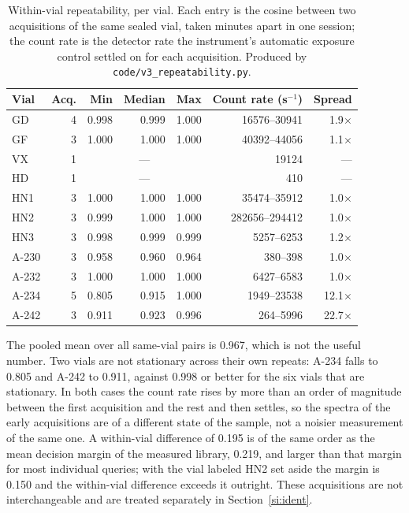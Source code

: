 \documentclass[11pt]{article}
\begin{document}
\begin{table}[htbp]
\centering
\caption{Within-vial repeatability, per vial. Each entry is the cosine between two
acquisitions of the same sealed vial, taken minutes apart in one session; the count rate is
the detector rate the instrument's automatic exposure control settled on for each
acquisition. Produced by \texttt{code/v3\_repeatability.py}.}
\label{tab:si-repeat}
\small
\begin{tabular}{lrrrrrr}
\toprule
Vial & Acq. & Min & Median & Max & Count rate (s$^{-1}$) & Spread \\
\midrule
GD & 4 & 0.998 & 0.999 & 1.000 & 16576--30941 & 1.9$\times$ \\
GF & 3 & 1.000 & 1.000 & 1.000 & 40392--44056 & 1.1$\times$ \\
VX & 1 & \multicolumn{3}{c}{---} & 19124 & --- \\
HD & 1 & \multicolumn{3}{c}{---} & 410 & --- \\
HN1 & 3 & 1.000 & 1.000 & 1.000 & 35474--35912 & 1.0$\times$ \\
HN2 & 3 & 0.999 & 1.000 & 1.000 & 282656--294412 & 1.0$\times$ \\
HN3 & 3 & 0.998 & 0.999 & 0.999 & 5257--6253 & 1.2$\times$ \\
A-230 & 3 & 0.958 & 0.960 & 0.964 & 380--398 & 1.0$\times$ \\
A-232 & 3 & 1.000 & 1.000 & 1.000 & 6427--6583 & 1.0$\times$ \\
A-234 & 5 & 0.805 & 0.915 & 1.000 & 1949--23538 & 12.1$\times$ \\
A-242 & 3 & 0.911 & 0.923 & 0.996 & 264--5996 & 22.7$\times$ \\
\bottomrule
\end{tabular}

\begin{flushleft}\footnotesize The pooled mean over all same-vial pairs is 0.967, which
is not the useful number. Two vials are not stationary across their own repeats:
A-234 falls to 0.805 and A-242 to
0.911, against 0.998 or better for the six vials
that are stationary. In both cases the count rate rises by more than an order of magnitude
between the first acquisition and the rest and then settles, so the spectra of the early
acquisitions are of a different state of the sample, not a noisier measurement of the same
one. A within-vial difference of 0.195 is of the same order as the mean decision margin
of the measured library, 0.219, and larger than that margin for most individual queries;
with the vial labeled HN2 set aside the margin is 0.150 and the within-vial difference
exceeds it outright. These acquisitions are not interchangeable and are treated separately
in Section~\ref{si:ident}.\end{flushleft}
\end{table}
\clearpage
\end{document}
